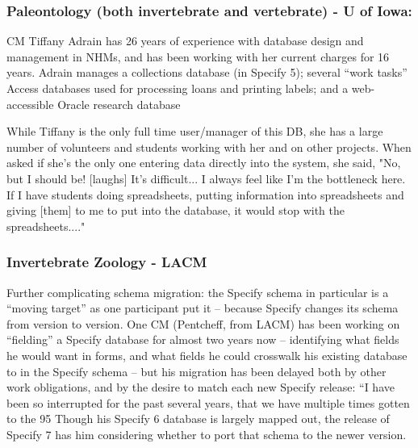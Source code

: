 \subsubsection{Paleontology (both invertebrate and vertebrate) - U of Iowa:}
CM Tiffany Adrain has 26 years of experience with database design and management in NHMs, and has been working with her current charges for 16 years.  Adrain manages a collections database (in Specify 5); several “work tasks” Access databases used for processing loans and printing labels; and a web-accessible Oracle research database 

While Tiffany is the only full time user/manager of this DB, she has a large number of volunteers and students working with her and on other projects.  When asked if she's the only one entering data directly into the system, she said, 
"No, but I should be!  [laughs]  It's difficult...  I always feel like I'm the bottleneck here.  If I have students doing spreadsheets, putting information into spreadsheets and giving [them] to me to put into the database, it would stop with the spreadsheets...."  

\subsubsection{Invertebrate Zoology - LACM}
Further complicating schema migration: the Specify schema in particular is a “moving target” as one participant put it – because Specify changes its schema from version to version.  One CM (Pentcheff, from LACM) has been working on “fielding” a Specify database for almost two years now – identifying what fields he would want in forms, and what fields he could crosswalk his existing database to in the Specify schema – but his migration has been delayed both by other work obligations, and by the desire to match each new Specify release:
“I have been so interrupted for the past several years, that we have multiple times gotten to the 95%
Though his Specify 6 database is largely mapped out, the release of Specify 7 has him considering whether to port that schema to the newer version. 


